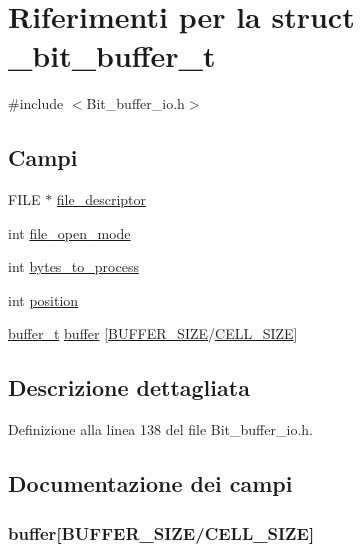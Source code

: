 \hypertarget{struct__bit__buffer__t}{\section{Riferimenti per la struct \-\_\-bit\-\_\-buffer\-\_\-t}
\label{struct__bit__buffer__t}
}


{\ttfamily \#include $<$Bit\-\_\-buffer\-\_\-io.\-h$>$}

\subsection*{Campi}
\begin{DoxyCompactItemize}
\item 
F\-I\-L\-E $\ast$ \hyperlink{struct__bit__buffer__t_a52a785c913c28c61f56c4aa10e3a1641}{file\-\_\-descriptor}
\item 
int \hyperlink{struct__bit__buffer__t_a5fce2ea8679deec1a923d8a352bd5b94}{file\-\_\-open\-\_\-mode}
\item 
int \hyperlink{struct__bit__buffer__t_aed9cc2d1f884f0962afd7f75bce3be7e}{bytes\-\_\-to\-\_\-process}
\item 
int \hyperlink{struct__bit__buffer__t_a401e942526aac47cef94f478182486e7}{position}
\item 
\hyperlink{_bit__buffer__io_8h_a30fe0633adbbaa7a5b6a4fd8d479bf0c}{buffer\-\_\-t} \hyperlink{struct__bit__buffer__t_a0102d48e26cd628e3d3455bce5aa5c47}{buffer} \mbox{[}\hyperlink{_bit__buffer__io_8h_a6b20d41d6252e9871430c242cb1a56e7}{B\-U\-F\-F\-E\-R\-\_\-\-S\-I\-Z\-E}/\hyperlink{_bit__buffer__io_8h_a7a4127f14f16563da90eb3c836bc404f}{C\-E\-L\-L\-\_\-\-S\-I\-Z\-E}\mbox{]}
\end{DoxyCompactItemize}


\subsection{Descrizione dettagliata}


Definizione alla linea 138 del file Bit\-\_\-buffer\-\_\-io.\-h.



\subsection{Documentazione dei campi}
\hypertarget{struct__bit__buffer__t_a0102d48e26cd628e3d3455bce5aa5c47}{
\subsubsection[{buffer}]{ buffer\mbox{[}{\bf B\-U\-F\-F\-E\-R\-\_\-\-S\-I\-Z\-E}/{\bf C\-E\-L\-L\-\_\-\-S\-I\-Z\-E}\mbox{]}}}\label{struct__bit__buffer__t_a0102d48e26cd628e3d3455bce5aa5c47}


